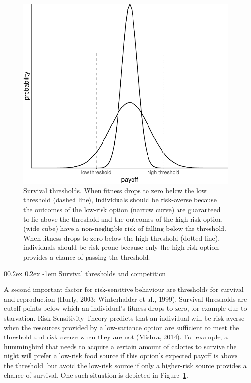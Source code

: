 \documentclass[british,,man,mask,floatsintext]{apa6}
\makeatletter
\renewcommand{\paragraph}{\@startsection{paragraph}{4}{\parindent}%
  {0\baselineskip \@plus 0.2ex \@minus 0.2ex}%
  {-1em}%
  {\normalfont\normalsize\bfseries\itshape\typesectitle}}
\makeatother
\begin{document}
\begin{figure}

{\centering \includegraphics[width=0.6\linewidth]{rr-risk-sensitivity_files/figure-latex/varianceplot-1} 

}

\caption{Survival thresholds. When fitness drops to zero below the low threshold (dashed line), individuals should be risk-averse because the outcomes of the low-risk option (narrow curve) are guaranteed to lie above the threshold and the outcomes of the high-risk option (wide cube) have a non-negligible risk of falling below the threshold. When fitness drops to zero below the high threshold (dotted line), individuals should be risk-prone because only the high-risk option provides a chance of passing the threshold.}\label{fig:varianceplot}
\end{figure}

\hypertarget{survival-thresholds-and-competition}{%
\paragraph{Survival thresholds and competition}\label{survival-thresholds-and-competition}}

A second important factor for risk-sensitive behaviour are thresholds for survival and reproduction (Hurly, 2003; Winterhalder et al., 1999).
Survival thresholds are cutoff points below which an individual's fitness drops to zero, for example due to starvation.
Risk-Sensitivity Theory predicts that an individual will be risk averse when the resources provided by a low-variance option are sufficient to meet the threshold and risk averse when they are not (Mishra, 2014).
For example, a hummingbird that needs to acquire a certain amount of calories to survive the night will prefer a low-risk food source if this option's expected payoff is above the threshold, but avoid the low-risk source if only a higher-risk source provides a chance of survival.
One such situation is depicted in Figure~\ref{fig:varianceplot}.
\end{document}
